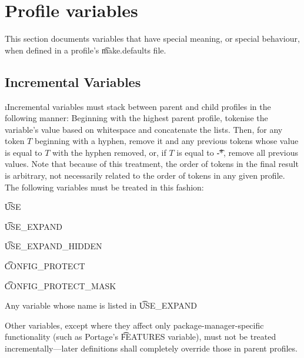\section{Profile variables}
\label{profile-variables}

This section documents variables that have special meaning, or special behaviour, when defined in a
profile's \t{make.defaults} file.

\subsection{Incremental Variables}
\i{Incremental} variables must stack between parent and child profiles in the following manner:
Beginning with the highest parent profile, tokenise the variable's value based on whitespace and
concatenate the lists. Then, for any token $T$ beginning with a hyphen, remove it and any previous
tokens whose value is equal to $T$ with the hyphen removed, or, if $T$ is equal to \t{-*}, remove
all previous values. Note that because of this treatment, the order of tokens in the final result is
arbitrary, not necessarily related to the order of tokens in any given profile. The following
variables must be treated in this fashion:
\begin{bulletlist}
\item \t{USE}
\item \t{USE\_EXPAND}
\item \t{USE\_EXPAND\_HIDDEN}
\item \t{CONFIG\_PROTECT}
\item \t{CONFIG\_PROTECT\_MASK}
\item Any variable whose name is listed in \t{USE\_EXPAND}
\end{bulletlist}

Other variables, except where they affect only package-manager-specific functionality (such as
Portage's \t{FEATURES} variable), must not be treated incrementally---later definitions shall
completely override those in parent profiles.

